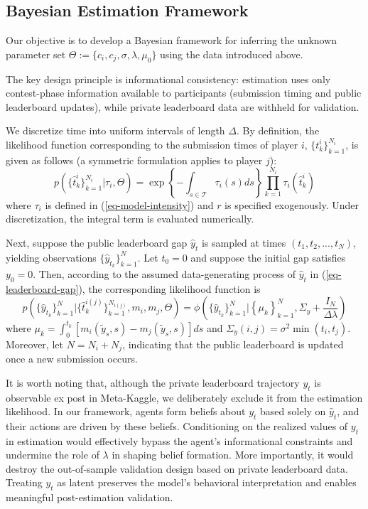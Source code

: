 \documentclass[mnsc]{informs3}
\begin{document}
\subsection{Bayesian Estimation Framework}

Our objective is to develop a Bayesian framework for inferring the unknown parameter set $\Theta := \{ c_i, c_j, \sigma, \lambda, \mu_0 \}$ using the data introduced above.

The key design principle is informational consistency: estimation uses only contest-phase information available to participants (submission timing and public leaderboard updates), while private leaderboard data are withheld for validation.

We discretize time into uniform intervals of length $\Delta$.
By definition, the likelihood function corresponding to the submission times of player $i$, $\{t^i_k\}_{k=1}^{N_i}$, is given as follows (a symmetric formulation applies to player $j$):
\begin{equation}\label{eq-ihpp-prob}
p\left(\{\hat{t}^i_k\}_{k=1}^{N_i} | \tau_i, \Theta\right) = \exp\left\{-\int_{s\in\mathcal{T}}\tau_i(s)ds\right\}\prod_{k=1}^{N_i}\tau_i(\hat{t}^i_k)
\end{equation}
where $\tau_i$ is defined in (\ref{eq-model-intensity}) and $r$ is specified exogenously.
Under discretization, the integral term is evaluated numerically.

Next, suppose the public leaderboard gap $\hat{y}_t$ is sampled at times $(t_1, t_2, ..., t_N)$, yielding observations $\{\hat{y}_{t_k}\}_{k=1}^N$.
Let $t_0 = 0$ and suppose the initial gap satisfies $y_0 = 0$.
Then, according to the assumed data-generating process of $\hat{y}_t$ in (\ref{eq-leaderboard-gap}), the corresponding likelihood function is
\begin{equation}\label{eq-obs_gap-prob}
p\left(\{\hat{y}_{t_k}\}_{k=1}^N | \{\hat{t}^{i(j)}_k\}_{k=1}^{N_{i(j)}}, m_i, m_j, \Theta\right) =
\phi\left(\{\hat{y}_{t_k}\}_{k=1}^N | \left\{\mu_k\right\}^N_{k=1}, \Sigma_y+\frac{I_N}{\Delta\lambda}\right)
\end{equation}
where $\mu_k = \int_{0}^{t_{k}}\left[m_i(\tilde{y}_s, s) - m_j(\tilde{y}_s, s)\right]ds$ and $\Sigma_y(i, j) = \sigma^2\min(t_i,t_j)$.
Moreover, let $N = N_i + N_j$, indicating that the public leaderboard is updated once a new submission occurs.

It is worth noting that, although the private leaderboard trajectory $y_t$ is observable ex post in Meta-Kaggle, we deliberately exclude it from the estimation likelihood.
In our framework, agents form beliefs about $y_t$ based solely on $\hat{y}_t$, and their actions are driven by these beliefs.
Conditioning on the realized values of $y_t$ in estimation would effectively bypass the agent’s informational constraints and undermine the role of $\lambda$ in shaping belief formation.
More importantly, it would destroy the out-of-sample validation design based on private leaderboard data.
Treating $y_t$ as latent preserves the model’s behavioral interpretation and enables meaningful post-estimation validation.
\end{document}
